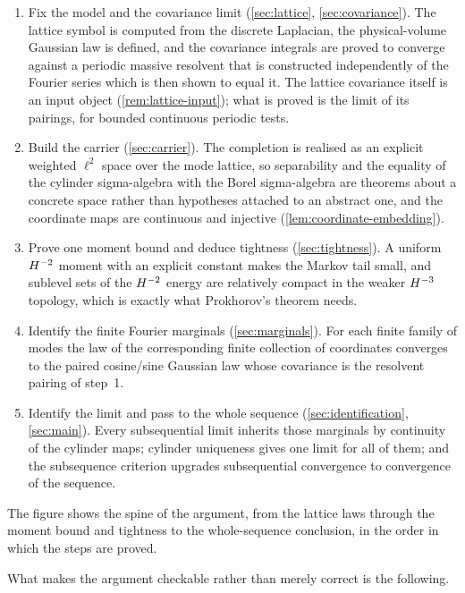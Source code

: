 \begin{enumerate}
\item Fix the model and the covariance limit (\cref{sec:lattice},
  \cref{sec:covariance}).  The lattice symbol is computed from the discrete
  Laplacian, the physical-volume Gaussian law is defined, and the covariance
  integrals are proved to converge against a periodic massive resolvent that is
  constructed independently of the Fourier series which is then shown to equal
  it.  The lattice covariance itself is an input object
  (\cref{rem:lattice-input}); what is proved is the limit of its pairings, for
  bounded continuous periodic tests.
\item Build the carrier (\cref{sec:carrier}).  The completion is realised as an
  explicit weighted $\ell^2$ space over the mode lattice, so separability and
  the equality of the cylinder sigma-algebra with the Borel sigma-algebra are
  theorems about a concrete space rather than hypotheses attached to an abstract
  one, and the coordinate maps are continuous and injective
  (\cref{lem:coordinate-embedding}).
\item Prove one moment bound and deduce tightness (\cref{sec:tightness}).  A
  uniform $H^{-2}$ moment with an explicit constant makes the Markov tail
  small, and sublevel sets of the $H^{-2}$ energy are relatively compact in the
  weaker $H^{-3}$ topology, which is exactly what Prokhorov's theorem needs.
\item Identify the finite Fourier marginals (\cref{sec:marginals}).  For each
  finite family of modes the law of the corresponding finite collection of
  coordinates converges to the paired cosine/sine Gaussian law whose covariance
  is the resolvent pairing of step~1.
\item Identify the limit and pass to the whole sequence
  (\cref{sec:identification}, \cref{sec:main}).  Every subsequential limit
  inherits those marginals by continuity of the cylinder maps; cylinder
  uniqueness gives one limit for all of them; and the subsequence criterion
  upgrades subsequential convergence to convergence of the sequence.
\end{enumerate}



The figure shows the spine of the argument, from the lattice laws through the
moment bound and tightness to the whole-sequence conclusion, in the order in
which the steps are proved.

What makes the argument checkable rather than merely correct is the following.

